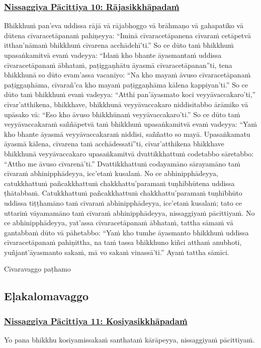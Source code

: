 \subsubsection*{\hyperref[forf-exp10]{Nissaggiya Pācittiya 10: Rājasikkhāpadaṁ}}
\label{np10}
Bhikkhuṁ pan'eva uddissa rājā vā rājabhoggo vā brāhmaṇo vā gahapatiko vā dūtena cīvaracetāpanaṁ pahiṇeyya: ``Iminā cīvaracetāpanena cīvaraṁ cetāpetvā itthan'nāmaṁ bhikkhuṁ cīvarena acchādehī'ti.'' So ce dūto taṁ bhikkhuṁ upasaṅkamitvā evaṁ vadeyya: ``Idaṁ kho bhante āyasmantaṁ uddissa cīvaracetāpanaṁ ābhataṁ, paṭiggaṇhātu āyasmā cīvaracetāpanan''ti, tena bhikkhunā so dūto evam'assa vacanīyo: ``Na kho mayaṁ āvuso cīvaracetāpanaṁ paṭiggaṇhāma, cīvarañ'ca kho mayaṁ paṭiggaṇhāma kālena kappiyan'ti.'' So ce dūto taṁ bhikkhuṁ evaṁ vadeyya: ``Atthi pan'āyasmato koci veyyāvaccakaro'ti,'' cīvar'atthikena, bhikkhave, bhikkhunā veyyāvaccakaro niddisitabbo ārāmiko vā upāsako vā: ``Eso kho āvuso bhikkhūnaṁ veyyāvaccakaro'ti.'' So ce dūto taṁ veyyāvaccakaraṁ saññāpetvā taṁ bhikkhuṁ upasaṅkamitvā evaṁ vadeyya: ``Yaṁ kho bhante āyasmā veyyāvaccakaraṁ niddisi, saññatto so mayā. Upasaṅkamatu āyasmā kālena, cīvarena taṁ acchādessatī''ti, cīvar'atthikena bhikkhave bhikkhunā veyyāvaccakaro upasaṅkamitvā dvattikkhattuṁ codetabbo sāretabbo: ``Attho me āvuso cīvarenā'ti.'' Dvattikkhattuṁ codayamāno sārayamāno taṁ cīvaraṁ abhinipphādeyya, icc'etaṁ kusalaṁ. No ce abhinipphādeyya, catukkhattuṁ pañcakkhattuṁ chakkhattu'paramaṁ tuṇhībhūtena uddissa ṭhātabbaṁ. Catukkhattuṁ pañcakkhattuṁ chakkhattu'paramaṁ tuṇhībhūto uddissa tiṭṭhamāno taṁ cīvaraṁ abhinipphādeyya, icc'etaṁ kusalaṁ; tato ce uttariṁ vāyamamāno taṁ cīvaraṁ abhinipphādeyya, nissaggiyaṁ pācittiyaṁ. No ce abhinipphādeyya, yat'assa cīvaracetāpanaṁ ābhataṁ, tattha sāmaṁ vā gantabbaṁ dūto vā pāhetabbo: ``Yaṁ kho tumhe āyasmanto bhikkhuṁ uddissa cīvaracetāpanaṁ pahiṇittha, na taṁ tassa bhikkhuno kiñci atthaṁ anubhoti, yuñjant'āyasmanto sakaṁ, mā vo sakaṁ vinassā'ti.'' Ayaṁ tattha sāmīci.

\begin{center}
  Cīvaravaggo paṭhamo
\end{center}

\subsection{Eḷakalomavaggo}
\vspace{0.2cm}

\subsubsection*{\hyperref[forf-exp11]{Nissaggiya Pācittiya 11: Kosiyasikkhāpadaṁ}}
\label{np11}
Yo pana bhikkhu kosiyamissakaṁ santhataṁ kārāpeyya, nissaggiyaṁ pācittiyaṁ.

